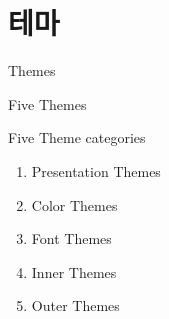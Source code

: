 \documentclass[10pt,blue,xcolor=pdftex,dvipsnames,table,handout]{beamer}
\begin{document}
		\section{테마}

		\begin{frame}[plain]
			Themes
		\end{frame}



		\begin{frame}[t]{Five Themes}

			\begin{block} {Five Theme categories}
			\begin{enumerate}
			\item Presentation Themes
			\item Color Themes
			\item Font Themes
			\item Inner Themes
			\item Outer Themes
			\end{enumerate}
			\end{block}

		\end{frame}
\end{document}
